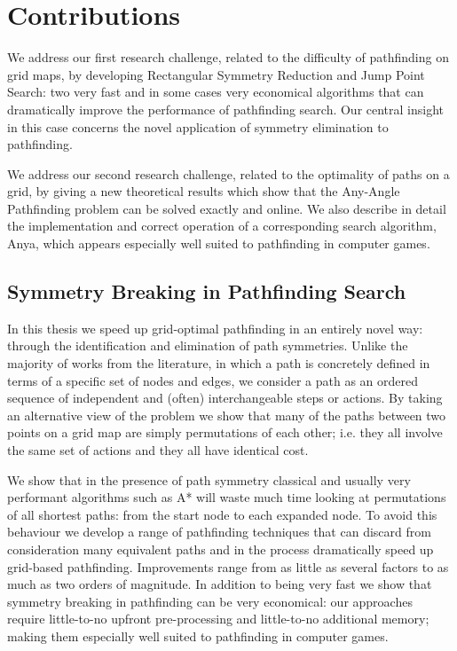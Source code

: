 \section{Contributions}
\label{cha::intro::contributions}
We address our first research challenge, related to the difficulty of
pathfinding on grid maps, by developing Rectangular Symmetry Reduction and
Jump Point Search: two very fast and in some cases very economical algorithms
that can dramatically improve the performance of pathfinding search.  Our
central insight in this case concerns the novel application of symmetry
elimination to pathfinding.

We address our second research challenge, related to the optimality of paths
on a grid, by giving a new theoretical results which show that the Any-Angle
Pathfinding problem can be solved exactly and online. We also describe in
detail the implementation and correct operation of a corresponding search
algorithm, Anya, which appears especially well suited to pathfinding in
computer games.

\subsection{Symmetry Breaking in Pathfinding Search}
In this thesis we speed up grid-optimal pathfinding in an entirely novel way:
through the identification and elimination of path symmetries.  Unlike the
majority of works from the literature, in which a path is concretely defined
in terms of a specific set of nodes and edges, we consider a path as an
ordered sequence of independent and (often) interchangeable steps or actions.
By taking an alternative view of the problem we show that many of the paths
between two points on a grid map are simply permutations of each other; i.e.
they all involve the same set of actions and they all have identical cost.

We show that in the presence of path symmetry classical and usually very
performant algorithms such as A{*} will waste much time looking at
permutations of all shortest paths: from the start node to each expanded node.
To avoid this behaviour we develop a range of pathfinding techniques that can
discard from consideration many equivalent paths and in the process
dramatically speed up grid-based pathfinding.  Improvements range from as
little as several factors to as much as two orders of magnitude.  In addition
to being very fast we show that symmetry breaking in pathfinding can be very
economical: our approaches require little-to-no upfront pre-processing and
little-to-no additional memory; making them especially well suited to
pathfinding in computer games.

